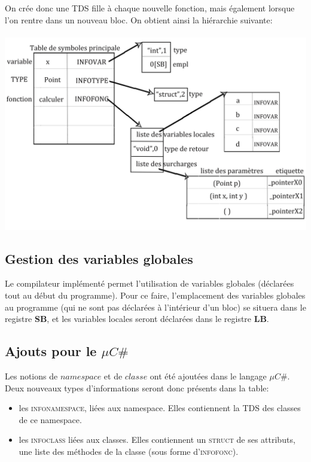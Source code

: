 \documentclass[11pt,a4paper]{report}
\begin{document}
On crée donc une TDS fille à chaque nouvelle fonction, mais également lorsque l'on rentre dans un nouveau bloc. On obtient ainsi la hiérarchie suivante: \\\\

\includegraphics[scale=0.2]{structureMicroC.jpg}

\subsection{Gestion des variables globales}

Le compilateur implémenté permet l'utilisation de variables globales (déclarées tout au début du programme). Pour ce faire, l'emplacement des variables globales au programme (qui ne sont pas déclarées à l'intérieur d'un bloc) se situera dans le registre {\bf SB}, et les variables locales seront déclarées dans le registre {\bf LB}.

\subsection{Ajouts pour le $\mu C \#$}

Les notions de  $namespace$ et de $classe$ ont été ajoutées dans le langage $\mu C \#$. Deux nouveaux types d'informations seront donc présents dans la table: 
\begin{itemize}
\item les \textsc{infonamespace}, liées aux namespace. Elles contiennent la TDS des classes de ce namespace.
\item les \textsc{infoclass} liées aux classes. Elles contiennent un \textsc{struct} de ses attributs, une liste des méthodes de la classe (sous forme d'\textsc{infofonc}).
\end{itemize}
\end{document}
